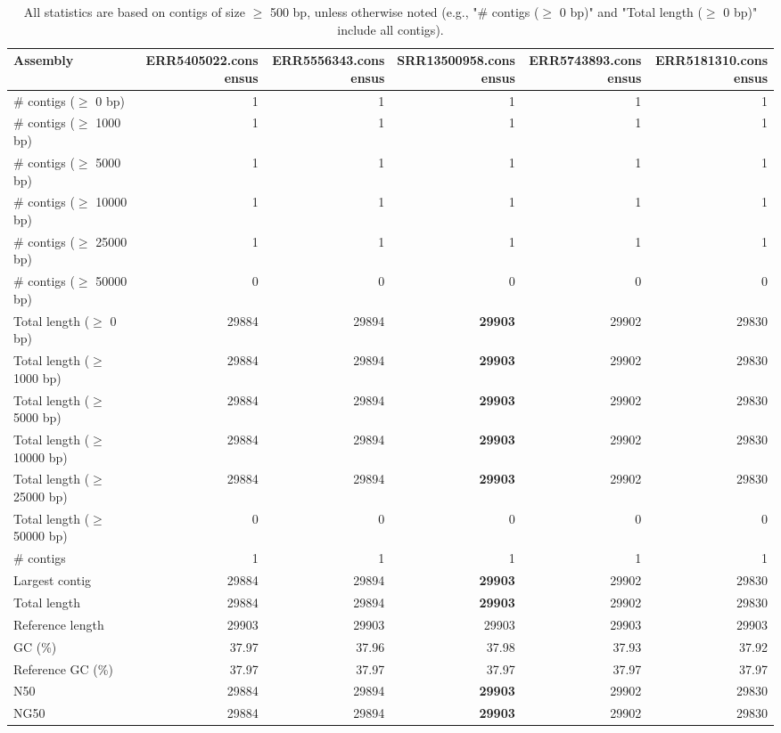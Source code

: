 \documentclass[12pt,a4paper]{article}
\begin{document}
\begin{table}[ht]
\begin{center}
\caption{All statistics are based on contigs of size $\geq$ 500 bp, unless otherwise noted (e.g., "\# contigs ($\geq$ 0 bp)" and "Total length ($\geq$ 0 bp)" include all contigs).}
\begin{tabular}{|l*{5}{|r}|}
\hline
Assembly & ERR5405022.consensus & ERR5556343.consensus & SRR13500958.consensus & ERR5743893.consensus & ERR5181310.consensus \\ \hline
\# contigs ($\geq$ 0 bp) & 1 & 1 & 1 & 1 & 1 \\ \hline
\# contigs ($\geq$ 1000 bp) & 1 & 1 & 1 & 1 & 1 \\ \hline
\# contigs ($\geq$ 5000 bp) & 1 & 1 & 1 & 1 & 1 \\ \hline
\# contigs ($\geq$ 10000 bp) & 1 & 1 & 1 & 1 & 1 \\ \hline
\# contigs ($\geq$ 25000 bp) & 1 & 1 & 1 & 1 & 1 \\ \hline
\# contigs ($\geq$ 50000 bp) & 0 & 0 & 0 & 0 & 0 \\ \hline
Total length ($\geq$ 0 bp) & 29884 & 29894 & {\bf 29903} & 29902 & 29830 \\ \hline
Total length ($\geq$ 1000 bp) & 29884 & 29894 & {\bf 29903} & 29902 & 29830 \\ \hline
Total length ($\geq$ 5000 bp) & 29884 & 29894 & {\bf 29903} & 29902 & 29830 \\ \hline
Total length ($\geq$ 10000 bp) & 29884 & 29894 & {\bf 29903} & 29902 & 29830 \\ \hline
Total length ($\geq$ 25000 bp) & 29884 & 29894 & {\bf 29903} & 29902 & 29830 \\ \hline
Total length ($\geq$ 50000 bp) & 0 & 0 & 0 & 0 & 0 \\ \hline
\# contigs & 1 & 1 & 1 & 1 & 1 \\ \hline
Largest contig & 29884 & 29894 & {\bf 29903} & 29902 & 29830 \\ \hline
Total length & 29884 & 29894 & {\bf 29903} & 29902 & 29830 \\ \hline
Reference length & 29903 & 29903 & 29903 & 29903 & 29903 \\ \hline
GC (\%) & 37.97 & 37.96 & 37.98 & 37.93 & 37.92 \\ \hline
Reference GC (\%) & 37.97 & 37.97 & 37.97 & 37.97 & 37.97 \\ \hline
N50 & 29884 & 29894 & {\bf 29903} & 29902 & 29830 \\ \hline
NG50 & 29884 & 29894 & {\bf 29903} & 29902 & 29830 \\ \hline

\end{tabular}
\end{center}
\end{table}
\end{document}
